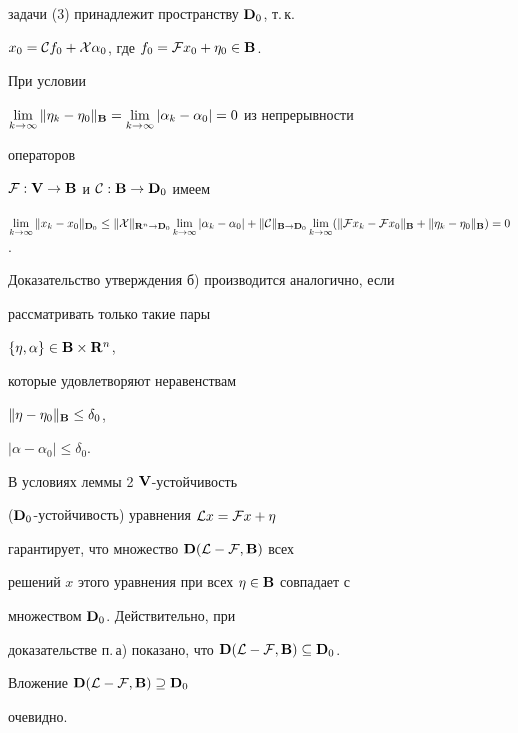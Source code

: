 \begin{pf}
задачи (3) принадлежит пространству $\bold {D}_0$, т.\,к.


$x_0={\cal C}f_0+{\cal X}\alpha_0$, где $f_0={\cal


F}x_0+\eta_0\in\spc{B}$.


При условии


$\lim\limits_{k\to\infty}\|\eta_k-\eta_0\|_{\bold B}=


\lim\limits_{k\to\infty}|\alpha_k-\alpha_0|=0$ из непрерывности


операторов


${\cal F}:\bold {V}\to\bold {B}$ и ${\cal C}:\bold {B}\to\bold {D}_0$ имеем


$\lim\limits_{k\to\infty}\|x_k-x_0\|_{\bold{D}_0}\le


\|{\cal X}\|_{\bold{R}^n\to{\bold{D}_0}}\lim\limits_{k\to\infty}


|\alpha_k-\alpha_0|+


\|{\cal C}\|_{\bold{B}\to{\bold{D}_0}}


\lim\limits_{k\to\infty}(\|{\cal F}x_k-{\cal F}x_0\|_{\bold B}+


\|\eta_k-\eta_0\|_{\bold B})=0$.





Доказательство утверждения б) производится аналогично, если


рассматривать только такие пары


$\{\eta,\alpha\}\in\bold {B}\times\bold {R}^n$,


которые удовлетворяют неравенствам


$\|\eta-\eta_0\|_{\bold B}\le\delta_0$,


$|\alpha-\alpha_0|\le\delta_0$.


\end{pf}





\begin{note}


В условиях леммы 2\; $\bold {V}$-устойчивость


($\bold {D}_0$-устойчивость) уравнения ${\cal L}x={\cal F}x+\eta$


гарантирует, что множество $\bold {D}({\cal L}-{\cal F},\bold {B})$ всех


решений $x$ этого уравнения при всех $\eta\in\bold {B}$ совпадает с


множеством $\bold {D}_0$. Действительно, при


доказательстве п.\,а) показано, что $\spc{D}({\cal L}-{\cal


F},\spc{B})\subseteq\spc{D}_0$.


Вложение $\bold {D}({\cal L}-{\cal F},\bold {B})\supseteq\bold {D}_0$


очевидно.


\end{note}





